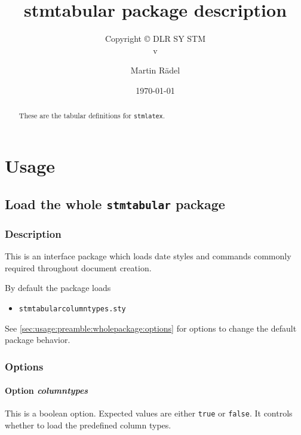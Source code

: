 \documentclass[%
  type=article,%
  layout=koma,%
  date=true,%
  hyperref=true,%
  listings=true,%
  math=true,%
]{stmtext}
\author{Martin R\"{a}del}
\title{stmtabular package description}
\subtitle{Copyright \copyright{} \the\year{} DLR SY STM\\v\formatdate[versiondatestyle]{\DTMToday}}
\date{\today}
\begin{document}
\maketitle

\begin{abstract}
These are the tabular definitions for \texttt{stmlatex}.
\end{abstract}

\tableofcontents

\section{Usage}%

\subsection{Load the whole \protect\texttt{stmtabular} package}
\label{sec:usage:preamble:wholepackage}

\subsubsection{Description}
\label{sec:usage:preamble:wholepackage:description}

This is an interface package which loads date styles and commands commonly required throughout document creation.

By default the package loads

\begin{itemize}[noitemsep]
  \item \verb+stmtabularcolumntypes.sty+
\end{itemize}

See \autoref{sec:usage:preamble:wholepackage:options} for options to change the default package behavior.

\subsubsection{Options}
\label{sec:usage:preamble:wholepackage:options}

\paragraph{Option \protect\textit{columntypes}} 
\label{sec:usage:preamble:wholepackage:options:columntypes}

This is a boolean option. Expected values are either \texttt{true} or \texttt{false}. It controls whether to load the predefined column types.
\end{document}
